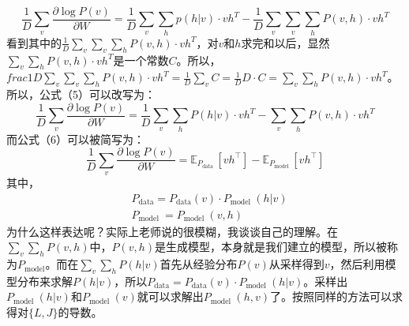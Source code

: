 \documentclass[a4paper]{article}
\begin{document}
\begin{equation}
\frac{1}{D} \sum_{v} \frac{\partial \log P(v)}{\partial W}=\frac{1}{D} \sum_{v} \sum_{h} p(h | v) \cdot v h^{T}-\frac{1}{D} \sum_{v} \sum_{v} \sum_{h} P(v, h)\cdot v h^{T}
\end{equation}
看到其中的$\frac{1}{D} \sum_{v} \sum_{v} \sum_{h} P(v, h)\cdot v h^{T}$，对$v$和$h$求完和以后，显然$\sum_{v} \sum_{h} P(v, h)\cdot v h^{T}$是一个常数$C$。所以，$frac{1}{D} \sum_{v} \sum_{v} \sum_{h} P(v, h)\cdot v h^{T} = \frac{1}{D} \sum_{v} C = \frac{1}{D} D\cdot C = \sum_{v} \sum_{h} P(v, h)\cdot v h^{T}$。所以，公式（5）可以改写为：
\begin{equation}
\frac{1}{D} \sum_{v} \frac{\partial \log P(v)}{\partial W}=\frac{1}{D} \sum_{v} \sum_{h} P(h | v) \cdot v h^{T}- \sum_{v} \sum_{h} P(v, h)\cdot v h^{T}
\end{equation}
而公式（6）可以被简写为：
\begin{equation}
\frac{1}{D} \sum_{v} \frac{\partial \log P(v)}{\partial W}=\mathbb{ E}_{P_{\text {data }}}\left[v h^{\top}\right]- \mathbb{E}_{P_{\text {model }}}\left[v h^{\top}\right]
\end{equation}
其中，
\begin{equation}
    \begin{split}
        & P_{\text{data}} =P_{\text{data}} (v) \cdot P_{\text {model }}(h | v) \\
        & P_{\text {model }}=P_{\text {model }}(v, h) 
    \end{split}
\end{equation}
为什么这样表达呢？实际上老师说的很模糊，我谈谈自己的理解。在$\sum_{v} \sum_{h} P(v, h)$中，$P(v,h)$是生成模型，本身就是我们建立的模型，所以被称为$P_{\text{model}}$。而在$\sum_{v} \sum_{h} P(h | v)$首先从经验分布$P(v)$从采样得到$v$，然后利用模型分布来求解$P(h | v)$，所以$P_{\text{data}} =P_{\text{data}} (v) \cdot P_{\text {model }}(h | v)$。采样出$ P_{\text {model }}(h | v)$和$P_{\text {model }}(v)$就可以求解出$P_{\text {model }}(h,v)$了。按照同样的方法可以求得对$\{L,J\}$的导数。
\end{document}
